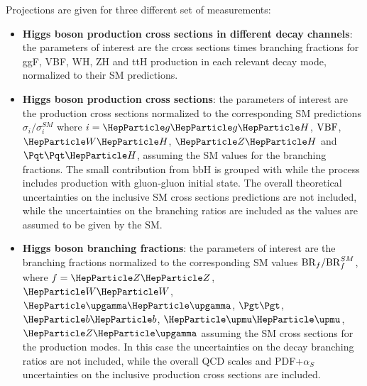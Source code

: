 
Projections are given for three different set of measurements:
\begin{itemize}
    \item \textbf{Higgs boson production cross sections in different decay channels}: the parameters of interest are the cross sections times branching fractions for ggF, VBF, WH, ZH and ttH production in each relevant decay mode, normalized to their SM predictions.
    \item \textbf{Higgs boson production cross sections}:  the parameters of interest are the production cross sections normalized to the corresponding SM predictions  $\sigma_{i}/\sigma_{i}^{SM}$  where $i=\ggh$, $\mathrm{VBF}$, $\wh$, $\zh$ and $\tth$, assuming the SM values for the branching fractions. The small contribution from bbH is grouped with \ggh while the \zh process includes \zh production with gluon-gluon initial state. The overall theoretical  uncertainties on the inclusive SM cross sections predictions are not included, while the uncertainties on the branching ratios are included as the values are assumed to be given by the SM.
    \item \textbf{Higgs boson branching fractions}: the parameters of interest are the branching fractions normalized to the corresponding SM values ${\rm BR}_{f}/{\rm BR}_{f}^{SM}$, where $f = \zz$, $\ww$, $\PGg\PGg$, $\tautau$, $\bb$, $\mumu$, $\PZ\PGg$ assuming the SM cross sections for the production modes. In this case  the uncertainties on the decay branching ratios are not included, while the overall QCD scales and PDF+$\alpha_{S}$ uncertainties on the inclusive production cross sections are included.

\end{itemize}


